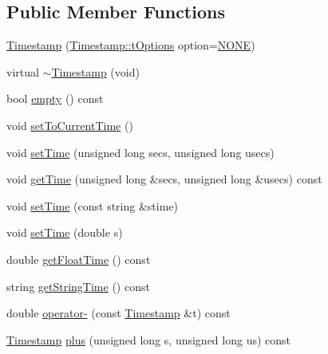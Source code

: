\subsection*{Public Member Functions}
\begin{DoxyCompactItemize}
\item 
\mbox{\hyperlink{class_d_utils_1_1_timestamp_a7edd67789d60b27acbee7f591ed3e2da}{Timestamp}} (\mbox{\hyperlink{class_d_utils_1_1_timestamp_a5a8a3cb7f9e0f73bf11fce42688b06c8}{Timestamp\+::t\+Options}} option=\mbox{\hyperlink{class_d_utils_1_1_timestamp_a5a8a3cb7f9e0f73bf11fce42688b06c8a786d448832975701b79c18f24f1d52c9}{N\+O\+NE}})
\item 
virtual \mbox{\hyperlink{class_d_utils_1_1_timestamp_a06ea20fe67d9e7177818ba219ea3137f}{$\sim$\+Timestamp}} (void)
\item 
bool \mbox{\hyperlink{class_d_utils_1_1_timestamp_a0aaa878aee63c543dea866892c003a62}{empty}} () const
\item 
void \mbox{\hyperlink{class_d_utils_1_1_timestamp_ae27c920f3833c104096213c6fb17f4d8}{set\+To\+Current\+Time}} ()
\item 
void \mbox{\hyperlink{class_d_utils_1_1_timestamp_a439bcff577f3ae30e8918897ecb33e76}{set\+Time}} (unsigned long secs, unsigned long usecs)
\item 
void \mbox{\hyperlink{class_d_utils_1_1_timestamp_a15e5c1a751a3faef596437a69d4c3d88}{get\+Time}} (unsigned long \&secs, unsigned long \&usecs) const
\item 
void \mbox{\hyperlink{class_d_utils_1_1_timestamp_ac35ad9d35e9ce5ff6fea159e9b060bf0}{set\+Time}} (const string \&stime)
\item 
void \mbox{\hyperlink{class_d_utils_1_1_timestamp_a797856da2823ee26814151ea97aea5e1}{set\+Time}} (double s)
\item 
double \mbox{\hyperlink{class_d_utils_1_1_timestamp_a360ea9b3a339c315f1a1eb2416787088}{get\+Float\+Time}} () const
\item 
string \mbox{\hyperlink{class_d_utils_1_1_timestamp_af1db3a964b6a7b88e73f7bd3110efd79}{get\+String\+Time}} () const
\item 
double \mbox{\hyperlink{class_d_utils_1_1_timestamp_ac7f07414867eaa6bea6acd7b41e9f60c}{operator-\/}} (const \mbox{\hyperlink{class_d_utils_1_1_timestamp}{Timestamp}} \&t) const
\item 
\mbox{\hyperlink{class_d_utils_1_1_timestamp}{Timestamp}} \mbox{\hyperlink{class_d_utils_1_1_timestamp_aaee4b5b30d2130e622636350c1332fcf}{plus}} (unsigned long s, unsigned long us) const

\end{DoxyCompactItemize}
